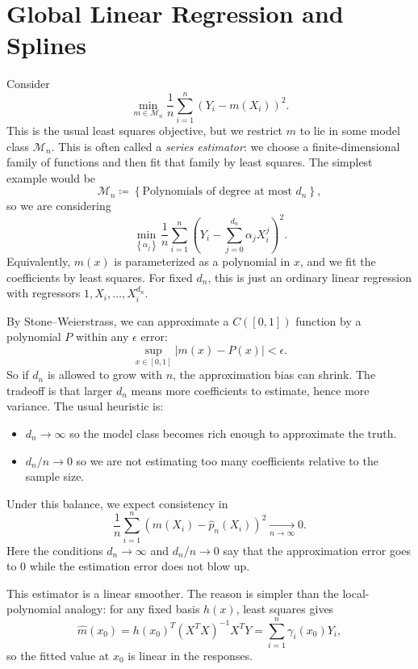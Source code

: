 
\section{Global Linear Regression and Splines}

Consider \[
		\min_{m \in \mathscr{M}_n} \frac{1}{n} \sum\limits_{i=1}^{n} \left( Y_i - m(X_i) \right)^2
.\] 
This is the usual least squares objective, but we restrict $m$ to lie in some model class $\mathscr{M}_n$.
This is often called a \emph{series estimator}: we choose a finite-dimensional family of functions and then fit that family by least squares.
The simplest example would be \[
		\mathscr{M}_n \coloneqq \left\{\text{Polynomials of degree at most }d_n\right\}
,\] so we are considering \[
		\min_{\left\{\alpha_j\right\}}\frac{1}{n} \sum\limits_{i=1}^{n} \left( Y_i - \sum\limits_{j=0}^{d_n} \alpha_j X_i^{j} \right)^2
.\] 
Equivalently, $m(x)$ is parameterized as a polynomial in $x$, and we fit the coefficients by least squares. For fixed $d_n$, this is just an ordinary linear regression with regressors $1,X_i,\ldots,X_i^{d_n}$.

By Stone--Weierstrass, we can approximate a $C\left( [0,1] \right)$ function by a polynomial $P$ within any $\epsilon$ error:
\[
	\sup_{x \in [0,1]} \left| m(x) - P(x) \right| < \epsilon
.\]
So if $d_n$ is allowed to grow with $n$, the approximation bias can shrink. The tradeoff is that larger $d_n$ means more coefficients to estimate, hence more variance. The usual heuristic is:
\begin{itemize}
	\item $d_n \to \infty$ so the model class becomes rich enough to approximate the truth.
	\item $d_n/n \to 0$ so we are not estimating too many coefficients relative to the sample size.
\end{itemize}
Under this balance, we expect consistency in
\[
	\frac{1}{n} \sum_{i=1}^{n} \left( m(X_i) - \hat{p}_n(X_i) \right)^2
	\xrightarrow[n\to\infty]{} 0.
\]
Here the conditions $d_n \to \infty$ and $d_n/n \to 0$ say that the approximation error goes to $0$ while the estimation error does not blow up.

This estimator is a linear smoother. The reason is simpler than the local-polynomial analogy: for any fixed basis $h(x)$, least squares gives
\[
	\hat{m}(x_0) = h(x_0)^T \left( X^T X \right)^{-1} X^T Y = \sum_{i=1}^{n} \gamma_i(x_0) Y_i,
\]
so the fitted value at $x_0$ is linear in the responses.

